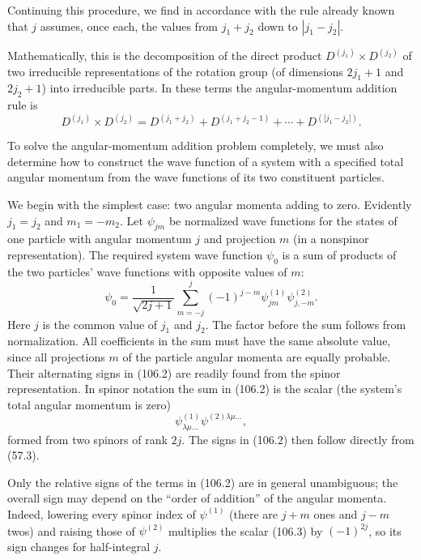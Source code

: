 Continuing this procedure, we find in accordance with the rule already known that $j$ assumes, once each, the values from $j_1+j_2$ down to $|j_1-j_2|$.

Mathematically, this is the decomposition of the direct product $D^{(j_1)}\times D^{(j_2)}$ of two irreducible representations of the rotation group (of dimensions $2j_1+1$ and $2j_2+1$) into irreducible parts. In these terms the angular-momentum addition rule is
\[
 D^{(j_1)}\times D^{(j_2)}=D^{(j_1+j_2)}+D^{(j_1+j_2-1)}+\cdots+D^{(|j_1-j_2|)}.
\]

To solve the angular-momentum addition problem completely, we must also determine how to construct the wave function of a system with a specified total angular momentum from the wave functions of its two constituent particles.

We begin with the simplest case: two angular momenta adding to zero. Evidently $j_1=j_2$ and $m_1=-m_2$. Let $\psi_{jm}$ be normalized wave functions for the states of one particle with angular momentum $j$ and projection $m$ (in a nonspinor representation). The required system wave function $\psi_0$ is a sum of products of the two particles' wave functions with opposite values of $m$:
\begin{equation}
 \psi_0=\frac{1}{\sqrt{2j+1}}\sum_{m=-j}^{j}(-1)^{j-m}\psi^{(1)}_{jm}\psi^{(2)}_{j,-m}.
 \tag{106.2}
\end{equation}
Here $j$ is the common value of $j_1$ and $j_2$. The factor before the sum follows from normalization. All coefficients in the sum must have the same absolute value, since all projections $m$ of the particle angular momenta are equally probable. Their alternating signs in (106.2) are readily found from the spinor representation. In spinor notation the sum in (106.2) is the scalar (the system's total angular momentum is zero)
\begin{equation}
 \psi^{(1)}_{\lambda\mu\ldots}\psi^{(2)\lambda\mu\ldots},
 \tag{106.3}
\end{equation}
formed from two spinors of rank $2j$. The signs in (106.2) then follow directly from (57.3).

Only the relative signs of the terms in (106.2) are in general unambiguous; the overall sign may depend on the ``order of addition'' of the angular momenta. Indeed, lowering every spinor index of $\psi^{(1)}$ (there are $j+m$ ones and $j-m$ twos) and raising those of $\psi^{(2)}$ multiplies the scalar (106.3) by $(-1)^{2j}$, so its sign changes for half-integral $j$.

